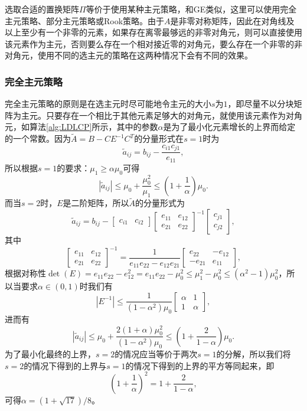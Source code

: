 \documentclass[a4paper,10pt]{ctexart}
\begin{document}
选取合适的置换矩阵$ \Pi $等价于使用某种主元策略，和GE类似，这里可以使用完全主元策略、部分主元策略或Rook策略。由于$ A $是非零对称矩阵，因此在对角线及以上至少有一个非零的元素，如果存在离零最够远的非零对角元，则可以直接使用该元素作为主元，否则要么存在一个相对接近零的对角元，要么存在一个非零的非对角元，使用不同的选主元的策略在这两种情况下会有不同的效果。

\subsubsection{完全主元策略}
完全主元策略的原则是在选主元时尽可能地令主元的大小$ s $为$ 1 $，即尽量不以分块矩阵为主元。只要存在一个相比于其他元素足够大的对角元，就使用该元素作为对角元，如算法\ref{alg:LDLCP}所示，其中的参数$ \alpha $是为了最小化元素增长的上界而给定的一个常数。因为$ \tilde{A} = B - CE^{-1}C^T $的分量形式在$ s=1 $时为
\[
    \tilde{a}_{ij} = b_{ij} - \frac{c_{i1}c_{j1}}{e_{11}},
\]
所以根据$ s=1 $的要求：$ \mu_1\geqslant \alpha \mu_0 $可得
\[
    \left\vert \tilde{a}_{ij} \right\vert \leqslant \mu_0 + \frac{\mu_0^2}{\mu_1}\leqslant (1+\frac{1}{\alpha})\mu_0.
\]
而当$ s=2 $时，$ E $是二阶矩阵，所以$ \tilde{A} $的分量形式为
\[
    \tilde{a}_{ij} = b_{ij} - 
    \begin{bmatrix} 
        c_{i1} & c_{i2}
    \end{bmatrix} 
    \begin{bmatrix} 
        e_{11} & e_{12} \\ e_{21} & e_{22} 
    \end{bmatrix}^{-1}
    \begin{bmatrix} 
        c_{j1} \\ c_{j2}
    \end{bmatrix},
\]
其中
\[
    \begin{bmatrix} 
        e_{11} & e_{12} \\ e_{21} & e_{22} 
    \end{bmatrix}^{-1} = \frac{1}{e_{11}e_{22}-e_{12}e_{21}}
    \begin{bmatrix} 
        e_{22} & -e_{12} \\ -e_{21} & e_{11} 
    \end{bmatrix},
\]
根据对称性$ \det(E) = e_{11}e_{22}-e_{12}^2 = e_{11}e_{22}-\mu_0^2 \leqslant \mu_1^2 - \mu_0^2\leqslant (\alpha^2-1)\mu_0^2 $，所以当要求$ \alpha\in (0,1) $时我们有
\[
    |E^{-1}| \leqslant \frac{1}{(1-\alpha^2) \mu_0}
    \begin{bmatrix} 
        \alpha & 1\\
        1 & \alpha 
    \end{bmatrix},
\]
进而有
\[
    \left\vert \tilde{a}_{ij} \right\vert \leqslant \mu_0 + \frac{2(1+\alpha)\mu_0^2}{(1-\alpha^2)\mu_0}\leqslant (1+\frac{2}{1-\alpha})\mu_0.
\]
为了最小化最终的上界，$ s=2 $的情况应当等价于两次$ s=1 $的分解，所以我们将$ s=2 $的情况下得到的上界与$ s=1 $的情况下得到的上界的平方等同起来，即
\[
    (1+\frac{1}{\alpha})^2 = 1+\frac{2}{1-\alpha},
\]
可得$ \alpha = (1+\sqrt{17}) / 8 $。
\end{document}

